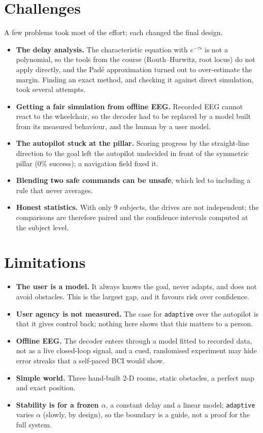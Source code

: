 \documentclass[11pt,a4paper]{article}
\newcommand{\code}[1]{\texttt{#1}}
\begin{document}
\section{Challenges}
A few problems took most of the effort; each changed the final design.
\begin{itemize}\setlength{\itemsep}{2pt}
\item \textbf{The delay analysis.} The characteristic equation with
$e^{-\tau s}$ is not a polynomial, so the tools from the course
(Routh--Hurwitz, root locus) do not apply directly, and the Pad\'e
approximation turned out to over-estimate the margin. Finding an exact
method, and checking it against direct simulation, took several
attempts.
\item \textbf{Getting a fair simulation from offline EEG.} Recorded EEG
cannot react to the wheelchair, so the decoder had to be replaced by a
model built from its measured behaviour, and the human by a user model.
\item \textbf{The autopilot stuck at the pillar.} Scoring progress by the
straight-line direction to the goal left the autopilot undecided in front
of the symmetric pillar (0\% success); a navigation field fixed it.
\item \textbf{Blending two safe commands can be unsafe}, which led to
including a rule that never averages.
\item \textbf{Honest statistics.} With only 9 subjects, the drives are not
independent; the comparisons are therefore paired and the confidence
intervals computed at the subject level.
\end{itemize}

\section{Limitations}
\begin{itemize}\setlength{\itemsep}{2pt}
\item \textbf{The user is a model.} It always knows the goal, never
adapts, and does not avoid obstacles. This is the largest gap, and it
favours risk over confidence.
\item \textbf{User agency is not measured.} The case for \code{adaptive}
over the autopilot is that it gives control back; nothing here shows
that this matters to a person.
\item \textbf{Offline EEG.} The decoder enters through a model fitted to
recorded data, not as a live closed-loop signal, and a cued, randomised
experiment may hide error streaks that a self-paced BCI would show.
\item \textbf{Simple world.} Three hand-built 2-D rooms, static obstacles,
a perfect map and exact position.
\item \textbf{Stability is for a frozen $\alpha$}, a constant delay and a
linear model; \code{adaptive} varies $\alpha$ (slowly, by design), so the
boundary is a guide, not a proof for the full system.
\end{itemize}
\end{document}
